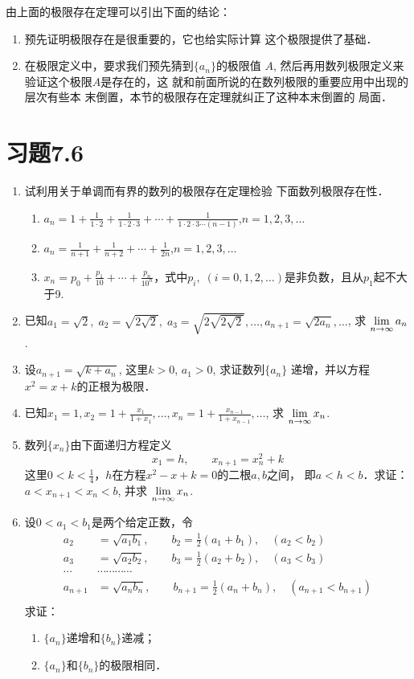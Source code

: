 由上面的极限存在定理可以引出下面的结论：
\begin{enumerate}
    \item 预先证明极限存在是很重要的，它也给实际计算
这个极限提供了基础．
\item 在极限定义中，要求我们预先猜到$\{a_n\}$的极限值
$A$, 然后再用数列极限定义来验证这个极限$A$是存在的，这
就和前面所说的在数列极限的重要应用中出现的层次有些本
末倒置，本节的极限存在定理就纠正了这种本末倒置的
局面．
\end{enumerate}

\section*{习题7.6}
\begin{enumerate}
    \item 试利用关于单调而有界的数列的极限存在定理检验
    下面数列极限存在性．
\begin{enumerate}
    \item $a_n=1+\frac{1}{1\cdot 2}+\frac{1}{1\cdot 2\cdot 3}+\cdots+\frac{1}{1\cdot 2\cdot 3\cdots (n-1)}$,\quad $n=1,2,3,\ldots$
    \item $a_n=\frac{1}{n+1}+\frac{1}{n+2}+\cdots +\frac{1}{2n}$,\quad $n=1,2,3,\ldots$
    \item $x_n=p_0+\frac{p_1}{10}+\cdots +\frac{p_n}{10^n}$，式中$p_i,\; (i=0,1,2,\ldots)$是非负数，且从$p_1$起不大于9.
\end{enumerate}
\item 已知$a_1=\sqrt{2},\; a_2=\sqrt{2\sqrt{2}},\; a_3=\sqrt{2\sqrt{2\sqrt{2}}},\ldots,a_{n+1}=\sqrt{2a_n},\ldots$, 求 $\displaystyle\lim_{n\to\infty}a_n$.
\item 设$a_{n+1}=\sqrt{k+a_n}$, 这里$k>0$, $a_1>0$, 求证数列$\{a_n\}$
递增，并以方程$x^2=x+k$的正根为极限．
\item 已知$x_1=1,x_2=1+\frac{x_1}{1+x_1},\ldots,x_n=1+\frac{x_{n-1}}{1+x_{n-1}},\ldots$, 求 $\displaystyle\lim_{n\to\infty}x_n$.

\item 数列$\{x_n\}$由下面递归方程定义
\[x_1=h,\qquad x_{n+1}=x_n^2+k\]
这里$0<k<\frac{1}{4}$，$h$在方程$x^2-x+k=0$的二根$a,b$之间，
即$a<h<b$．求证：$a<x_{n+1}<x_n<b$, 并求 $\displaystyle\lim_{n\to\infty}x_n$.

\item 设$0<a_1<b_1$是两个给定正数，令
\[\begin{split}
    a_2&=\sqrt{a_1b_1},\qquad b_2=\frac{1}{2}(a_1+b_1),\quad (a_2<b_2)\\
    a_3&=\sqrt{a_2b_2},\qquad b_3=\frac{1}{2}(a_2+ b_2),\quad (a_3<b_3)\\
\cdots &\cdots\cdots\cdots\cdots\\
    a_{n+1}&=\sqrt{a_nb_n},\qquad b_{n+1}=\frac{1}{2}(a_n+b_n),\quad (a_{n+1}<b_{n+1})\\
\end{split}\]
求证：
\begin{enumerate}
    \item $\{a_n\}$递增和$\{b_n\}$递减；
    \item $\{a_n\}$和$\{b_n\}$的极限相同．
\end{enumerate}
\end{enumerate}